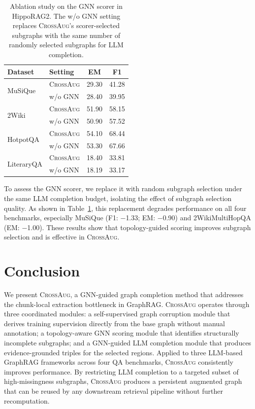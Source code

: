 \documentclass[11pt]{article}
\newcommand{\ours}{\textsc{CrossAug}\xspace}
\begin{document}
\begin{table}[!htbp]
\centering
\small
\setlength{\tabcolsep}{0pt}
\begin{tabular*}{\columnwidth}{@{\extracolsep{\fill}}llcc@{}}
\toprule
\textbf{Dataset} & \textbf{Setting} & \textbf{EM} & \textbf{F1} \\
\midrule
\multirow{2}{*}{MuSiQue}
& \ours & 29.30 & 41.28 \\
& w/o GNN & 28.40 & 39.95 \\
\midrule
\multirow{2}{*}{2Wiki}
& \ours & 51.90 & 58.15 \\
& w/o GNN & 50.90 & 57.52 \\
\midrule
\multirow{2}{*}{HotpotQA}
& \ours & 54.10 & 68.44 \\
& w/o GNN & 53.30 & 67.66 \\
\midrule
\multirow{2}{*}{LiteraryQA}
& \ours & 18.40 & 33.81 \\
& w/o GNN & 18.19 & 33.17 \\
\bottomrule
\end{tabular*}
\caption{Ablation study on the GNN scorer in HippoRAG2. The w/o GNN setting replaces \ours's scorer-selected subgraphs with the same number of randomly selected subgraphs for LLM completion.}
\label{tab:ablation-random-subgraph}
\end{table}

To assess the GNN scorer, we replace it with random subgraph selection under the same LLM completion budget, isolating the effect of subgraph selection quality. As shown in Table~\ref{tab:ablation-random-subgraph}, this replacement degrades performance on all four benchmarks, especially MuSiQue (F1: $-$1.33; EM: $-$0.90) and 2WikiMultiHopQA (EM: $-$1.00). These results show that topology-guided scoring improves subgraph selection and is effective in \ours.

\section{Conclusion}

We present \ours, a GNN-guided graph completion method that addresses the chunk-local extraction bottleneck in GraphRAG. \ours operates through three coordinated modules: a self-supervised graph corruption module that derives training supervision directly from the base graph without manual annotation; a topology-aware GNN scoring module that identifies structurally incomplete subgraphs; and a GNN-guided LLM completion module that produces evidence-grounded triples for the selected regions. Applied to three LLM-based GraphRAG frameworks across four QA benchmarks, \ours consistently improves performance. By restricting LLM completion to a targeted subset of high-missingness subgraphs, \ours produces a persistent augmented graph that can be reused by any downstream retrieval pipeline without further recomputation.
\end{document}
